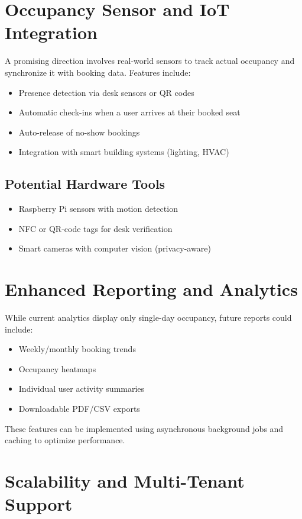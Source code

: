 \documentclass[12pt,a4paper]{report}
\begin{document}
\section{Occupancy Sensor and IoT Integration}

A promising direction involves real-world sensors to track actual occupancy and synchronize it with booking data. Features include:

\begin{itemize}
    \item Presence detection via desk sensors or QR codes
    \item Automatic check-ins when a user arrives at their booked seat
    \item Auto-release of no-show bookings
    \item Integration with smart building systems (lighting, HVAC)
\end{itemize}

\subsection*{Potential Hardware Tools}
\begin{itemize}
    \item Raspberry Pi sensors with motion detection
    \item NFC or QR-code tags for desk verification
    \item Smart cameras with computer vision (privacy-aware)
\end{itemize}

\section{Enhanced Reporting and Analytics}

While current analytics display only single-day occupancy, future reports could include:

\begin{itemize}
    \item Weekly/monthly booking trends
    \item Occupancy heatmaps
    \item Individual user activity summaries
    \item Downloadable PDF/CSV exports
\end{itemize}

These features can be implemented using asynchronous background jobs and caching to optimize performance.

\section{Scalability and Multi-Tenant Support}
\end{document}
